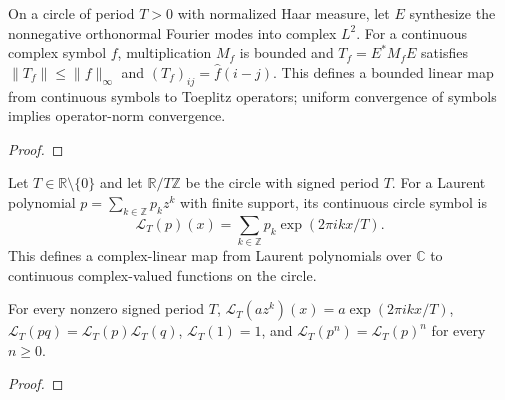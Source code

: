 \begin{theorem}
\label{thm:toeplitz-continuous}
\leanok
On a circle of period $T>0$ with normalized Haar measure, let $E$ synthesize
the nonnegative orthonormal Fourier modes into complex $L^2$. For a continuous
complex symbol $f$, multiplication $M_f$ is bounded and
$T_f=E^*M_fE$ satisfies $\|T_f\|\le\|f\|_\infty$ and
$(T_f)_{ij}=\widehat f(i-j)$. This defines a bounded linear map from continuous
symbols to Toeplitz operators; uniform convergence of symbols implies operator-norm
convergence.
\end{theorem}
\begin{proof}
\leanok
\end{proof}



\begin{supporting}
\begin{definition}
\label{def:laurent-symbol}
\leanok
Let $T\in\mathbb R\setminus\{0\}$ and let $\mathbb R/T\mathbb Z$ be the circle
with signed period $T$. For a Laurent polynomial $p=\sum_{k\in\mathbb Z}p_kz^k$
with finite support, its continuous circle symbol is
\[
 \mathcal L_T(p)(x)=\sum_{k\in\mathbb Z}p_k\exp(2\pi i kx/T).
\]
This defines a complex-linear map from Laurent polynomials over $\mathbb C$ to continuous
complex-valued functions on the circle.
\end{definition}

\begin{theorem}
\label{thm:laurent-symbol-algebra}
\leanok
For every nonzero signed period $T$,
$\mathcal L_T(az^k)(x)=a\exp(2\pi i kx/T)$,
$\mathcal L_T(pq)=\mathcal L_T(p)\mathcal L_T(q)$,
$\mathcal L_T(1)=1$, and $\mathcal L_T(p^n)=\mathcal L_T(p)^n$
for every $n\ge0$.
\end{theorem}
\begin{proof}
\leanok
\end{proof}
\end{supporting}



